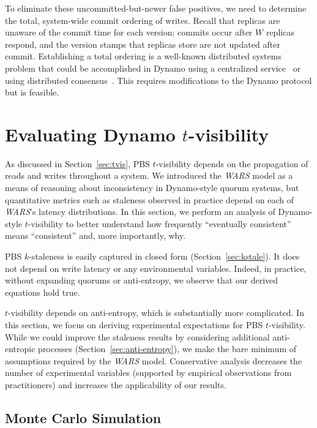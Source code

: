 \documentclass{vldb}
\newcommand{\sectionskip}{-0em}
\newcommand{\subsectionskip}{-0em}
\begin{document}
To eliminate these uncommitted-but-newer false positives, we need to
determine the total, system-wide commit ordering of writes. Recall
that replicas are unaware of the commit time for each version; commits
occur after $W$ replicas respond, and the version stamps that replicas
store are not updated after commit.  Establishing a total ordering is
a well-known distributed systems problem that could be accomplished in
Dynamo using a centralized service~\cite{zookeeper} or using
distributed consensus~\cite{paxos}. This requires modifications to the
Dynamo protocol but is feasible.



\vspace{\sectionskip}\section{Evaluating Dynamo {\large $t$}-visibility}
\label{sec:dynamoeval}

As discussed in Section~\ref{sec:tvis}, PBS $t$-visibility depends on
the propagation of reads and writes throughout a system.  We
introduced the \textit{WARS} model as a means of reasoning about
inconsistency in Dynamo-style quorum systems, but quantitative metrics
such as staleness observed in practice depend on each of
\textit{WARS}'s latency distributions.  In this section, we perform an
analysis of Dynamo-style $t$-visibility to better understand how
frequently ``eventually consistent'' means ``consistent'' and, more
importantly, why.

PBS $k$-staleness is easily captured in closed form
(Section~\ref{sec:kstale}).  It does not depend on write latency or
any environmental variables.  Indeed, in practice, without expanding
quorums or anti-entropy, we observe that our derived equations hold
true.

$t$-visibility depends on anti-entropy, which is substantially more
complicated.  In this section, we focus on deriving experimental
expectations for PBS $t$-visibility.  While we could improve the
staleness results by considering additional anti-entropic processes
(Section~\ref{sec:anti-entropy}), we make the bare minimum of
assumptions required by the \textit{WARS} model.  Conservative
analysis decreases the number of experimental variables (supported by
empirical observations from practitioners) and increases the
applicability of our results.

\vspace{\subsectionskip}\subsection{Monte Carlo Simulation}
\label{sec:mcsim}
\end{document}
